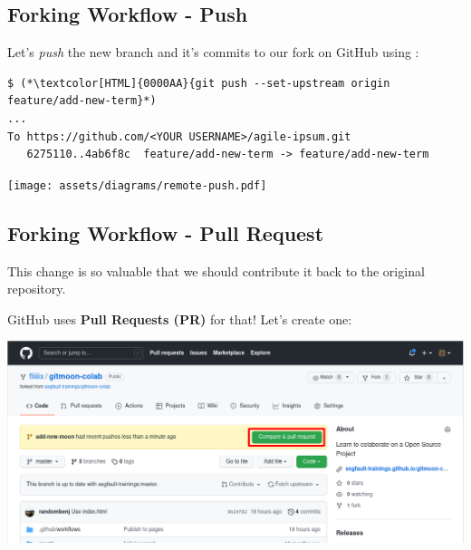 \subsection{Forking Workflow - Push}
\begin{frame}[fragile]
  \subslidetitle

  Let's \textit{push} the new branch and it's commits to our fork on GitHub using :

  \begin{lstlisting}
$ (*\textcolor[HTML]{0000AA}{git push --set-upstream origin feature/add-new-term}*)
...
To https://github.com/<YOUR USERNAME>/agile-ipsum.git
   6275110..4ab6f8c  feature/add-new-term -> feature/add-new-term
\end{lstlisting}

  \centerline{\texttt{[image: assets/diagrams/remote-push.pdf]}}

\end{frame}

\subsection{Forking Workflow - Pull Request}
\begin{frame}[fragile]
  \subslidetitle

  This change is so valuable that we should contribute it back to the original repository.

  \vspace{1em}
    GitHub uses \textbf{Pull Requests (PR)} for that! Let's create one:

  \vspace{1em}
  \centerline{\includegraphics[width=\textwidth]{../assets/images/github-pull-request-create.png}}

\end{frame}


